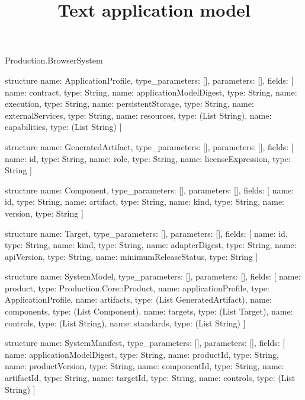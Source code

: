 \begin{lexlean}{Production.BrowserSystem}
\title{Text application model}
\begin{semanticmodule}
structure{
  name: ApplicationProfile,
  type_parameters: [],
  parameters: [],
  fields: [
    {name: contract, type: String},
    {name: applicationModelDigest, type: String},
    {name: execution, type: String},
    {name: persistentStorage, type: String},
    {name: externalServices, type: String},
    {name: resources, type: (List String)},
    {name: capabilities, type: (List String)}
  ]
}

structure{
  name: GeneratedArtifact,
  type_parameters: [],
  parameters: [],
  fields: [
    {name: id, type: String},
    {name: role, type: String},
    {name: licenseExpression, type: String}
  ]
}

structure{
  name: Component,
  type_parameters: [],
  parameters: [],
  fields: [
    {name: id, type: String},
    {name: artifact, type: String},
    {name: kind, type: String},
    {name: version, type: String}
  ]
}

structure{
  name: Target,
  type_parameters: [],
  parameters: [],
  fields: [
    {name: id, type: String},
    {name: kind, type: String},
    {name: adapterDigest, type: String},
    {name: apiVersion, type: String},
    {name: minimumReleaseStatus, type: String}
  ]
}

structure{
  name: SystemModel,
  type_parameters: [],
  parameters: [],
  fields: [
    {name: product, type: Production.Core::Product},
    {name: applicationProfile, type: ApplicationProfile},
    {name: artifacts, type: (List GeneratedArtifact)},
    {name: components, type: (List Component)},
    {name: targets, type: (List Target)},
    {name: controls, type: (List String)},
    {name: standards, type: (List String)}
  ]
}

structure{
  name: SystemManifest,
  type_parameters: [],
  parameters: [],
  fields: [
    {name: applicationModelDigest, type: String},
    {name: productId, type: String},
    {name: productVersion, type: String},
    {name: componentId, type: String},
    {name: artifactId, type: String},
    {name: targetId, type: String},
    {name: controls, type: (List String)}
  ]
}
\end{semanticmodule}
\end{lexlean}

